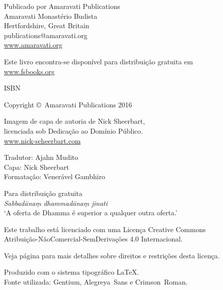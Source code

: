 \cleartoverso
\thispagestyle{empty}

{\copyrightsize
\centering
\setlength{\parindent}{0pt}%
\setlength{\parskip}{0.8\baselineskip}%

\thetitle

Publicado por Amaravati Publications\\
Amaravati Monastério Budista\\
Hertfordshire, Great Britain\\
publications@amaravati.org\\
\href{http://amaravati.org}{www.amaravati.org}

Este livro encontra-se disponível para distribuição gratuita em\\
\href{http://fsbooks.org/}{www.fsbooks.org}

ISBN \theISBN

Copyright \copyright\ Amaravati Publications 2016

Imagem de capa de autoria de Nick Sheerbart,\\
licenciada sob Dedicação ao Domínio Público.\\
\href{http://www.nick-scheerbart.com/}{www.nick-scheerbart.com}

Tradutor: Ajahn Mudito\\
Capa: Nick Sheerbart\\
Formatação: Venerável Gambhīro

\vfill

{\footnotesize

Para distribuição gratuita\\
\textit{Sabbadānaṃ dhammadānaṃ jinati}\\
‘A oferta de Dhamma é superior a qualquer outra oferta.’

Este trabalho está licenciado com uma Licença Creative Commons\\
Atribuição-NãoComercial-SemDerivações 4.0 Internacional.

Veja página \pageref{copyright-details} para mais detalhes sobre direitos e restrições desta licença.

Produzido com o sistema tipográfico \LaTeX.\\
Fonte utilizada: Gentium, Alegreya~Sans e Crimson~Roman.

\theEditionInfo

}}
